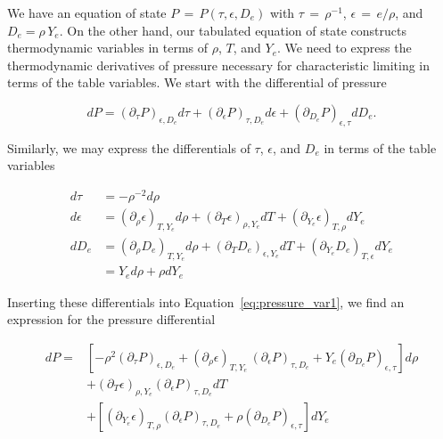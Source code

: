 We have an equation of state $P \,=\, P(\tau, \epsilon, D_{e})$ with $\tau \,=\, \rho^{-1}$, 
$\epsilon \,=\, e/ \rho$, and $D_{e} = \rho \, Y_{e}$. On the other hand, 
our tabulated equation of state constructs thermodynamic variables in terms of $\rho$, $T$, and $Y_{e}$. We 
need to express the thermodynamic derivatives of pressure necessary for characteristic limiting in terms of the table variables.
We start with the differential of pressure 

\begin{equation}
 \label{eq:pressure_var1}
  dP = (\partial_{\tau}P)_{\epsilon, D_{e}}d\tau + (\partial_{\epsilon}P)_{\tau, D_{e}}d\epsilon + (\partial_{D_{e}}P)_{\epsilon, \tau}dD_{e}.
\end{equation}

Similarly, we may express the differentials of $\tau$, $\epsilon$, and $D_{e}$ in terms of the table variables

\begin{equation}
\begin{split}
  d\tau &= - \rho^{-2} d\rho\\
  d\epsilon &= (\partial_{\rho}\epsilon)_{T,Y_{e}}d\rho + (\partial_{T}\epsilon)_{\rho,Y_{e}}dT + (\partial_{Y_{e}}\epsilon)_{T,\rho}dY_{e}\\
  dD_{e} &= (\partial_{\rho}D_{e})_{T,Y_{e}}d\rho + (\partial_{T}D_{e})_{\epsilon,Y_{e}}dT + (\partial_{Y_{e}}D_{e})_{T,\epsilon}dY_{e}\\
   & = Y_{e} d\rho + \rho dY_{e}
\end{split}
\end{equation}

Inserting these differentials into Equation~\ref{eq:pressure_var1}, we find an expression for the pressure differential

\begin{equation} \label{eq:pressure_dif}
\begin{split}
  dP = &\left[ -\rho^{2} (\partial_{\tau}P)_{\epsilon, D_{e}} + (\partial_{\rho}\epsilon)_{T,Y_{e}}\,(\partial_{\epsilon}P)_{\tau, D_{e}}
    + Y_{e} (\partial_{D_{e}}P)_{\epsilon, \tau} \right] d\rho \\
    & + (\partial_{T}\epsilon)_{\rho,Y_{e}} (\partial_{\epsilon}P)_{\tau, D_{e}} dT \\
	& + \left[ (\partial_{Y_{e}}\epsilon)_{T,\rho} (\partial_{\epsilon}P)_{\tau, D_{e}} + \rho (\partial_{D_{e}}P)_{\epsilon, \tau}\right]dY_{e}   
\end{split}
\end{equation}

